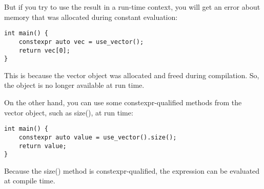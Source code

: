 But if you try to use the result in a run-time context, you will get an error about memory that was allocated during constant evaluation:

\begin{lstlisting}[style=styleCXX]
int main() {
	constexpr auto vec = use_vector();
	return vec[0];
}
\end{lstlisting}

This is because the vector object was allocated and freed during compilation. So, the object is no longer available at run time.

On the other hand, you can use some constexpr-qualified methods from the vector object, such as size(), at run time:

\begin{lstlisting}[style=styleCXX]
int main() {
	constexpr auto value = use_vector().size();
	return value;
}
\end{lstlisting}

Because the size() method is constexpr-qualified, the expression can be evaluated at compile time.












